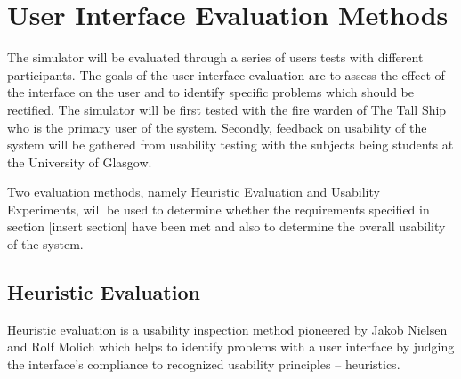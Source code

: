 

%
\section{User Interface Evaluation Methods}
\label{evalmethods}

The simulator will be evaluated through a series of users tests with different participants. The goals of the user interface evaluation are to assess the effect of the interface on the user and to identify specific problems which should be rectified. The simulator will be first tested with the fire warden of The Tall Ship who is the primary user of the system. Secondly, feedback on usability of the system will be gathered from usability testing with the subjects being students at the University of Glasgow.

Two evaluation methods, namely Heuristic Evaluation and Usability Experiments, will be used to determine whether the requirements specified in section [insert section] have been met and also to determine the overall usability of the system.

\subsection{Heuristic Evaluation}
Heuristic evaluation is a usability inspection method pioneered by Jakob Nielsen and Rolf Molich which helps to identify problems with a user interface by judging the interface’s compliance to recognized usability principles -- heuristics\cite{heuristics}.

